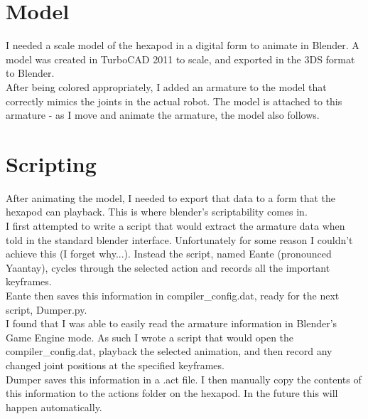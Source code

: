 			\section{Model}
				I needed a scale model of the hexapod in a digital form to animate in Blender. A model was created in  TurboCAD 2011 to scale, and exported in the 3DS format to Blender.\\
				
				After being colored appropriately, I added an armature to the model that correctly mimics the joints in the actual robot. The model is attached to this armature - as I move and animate the armature, the model also follows.\\			
			
			\section{Scripting}
				After animating the model, I needed to export that data to a form that the hexapod can playback. This is where blender's scriptability comes in.\\
				
				I first attempted to write a script that would extract the armature data when told in the standard blender interface. Unfortunately for some reason I couldn't achieve this (I forget why...). Instead the script, named Eante (pronounced Yaantay), cycles through the selected action and records all the important keyframes.\\
				
				Eante then saves this information in compiler\_config.dat, ready for the next script, Dumper.py.\\
				
				I found that I was able to easily read the armature information in Blender's Game Engine mode. As such I wrote a script that would open the compiler\_config.dat, playback the selected animation, and then record any changed joint positions at the specified keyframes.\\
				
				Dumper saves this information in a .act file. I then manually copy the contents of this information to the actions folder on the hexapod. In the future this will happen automatically.\\
				
            
